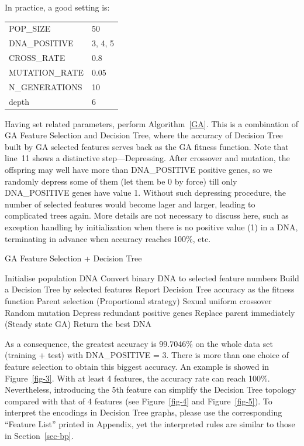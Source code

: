 \documentclass[runningheads]{llncs}
\begin{document}
In practice, a good setting is:
\begin{center}
	\begin{tabular}{l@{\quad=\quad}l}
		POP\_SIZE & 50 \\
		DNA\_POSITIVE & 3, 4, 5 \\
		CROSS\_RATE & 0.8 \\
		MUTATION\_RATE & 0.05 \\
		N\_GENERATIONS & 10 \\
		depth & 6 \\
	\end{tabular}
\end{center}

Having set related parameters, perform Algorithm~\ref{GA}. This is a combination of GA Feature Selection and Decision Tree, where the accuracy of Decision Tree built by GA selected features serves back as the GA fitness function. Note that line~11 shows a distinctive step---Depressing. After crossover and mutation, the offspring may well have more than DNA\_POSITIVE positive genes, so we randomly depress some of them (let them be 0 by force) till only DNA\_POSITIVE genes have value 1. Without such depressing procedure, the number of selected features would become lager and larger, leading to complicated trees again. More details are not necessary to discuss here, such as exception handling by initialization when there is no positive value (1) in a DNA, terminating in advance when accuracy reaches 100\%, etc.

\begin{algorithm}[htbp]
	\caption{GA Feature Selection + Decision Tree}
	\label{GA}
	\begin{algorithmic}
		\STATE Initialise population DNA
		\STATE Convert binary DNA to selected feature numbers
		\STATE Build a Decision Tree by selected features
		\STATE Report Decision Tree accuracy as the fitness function
		\ENDFOR
		\STATE Parent selection (Proportional strategy)
		\STATE Sexual uniform crossover
		\STATE Random mutation
		\STATE Depress redundant positive genes
		\STATE Replace parent immediately (Steady state GA)
		\ENDFOR
		\STATE Return the best DNA
	\end{algorithmic} 
\end{algorithm}

As a consequence,  the greatest accuracy is 99.7046\% on the whole data set (training + test) with DNA\_POSITIVE = 3. There is more than one choice of feature selection to obtain this biggest accuracy. An example is showed in Figure~\ref{fig-3}. With at least 4 features, the accuracy rate can reach 100\%. Nevertheless, introducing the 5th feature can simplify the Decision Tree topology compared with that of 4 features (see Figure~\ref{fig-4} and Figure~\ref{fig-5}). To interpret the encodings in Decision Tree graphs, please use the corresponding ``Feature List'' printed in Appendix, yet the interpreted rules are similar to those in Section~\ref{sec-bp}.
\end{document}
